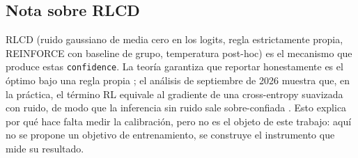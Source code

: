 \subsection{Nota sobre RLCD}

RLCD (ruido gaussiano de media cero en los logits, regla estrictamente propia, REINFORCE con baseline de
grupo, temperatura post-hoc) es el mecanismo que produce estas \texttt{confidence}. La teoría garantiza que
reportar honestamente es el óptimo bajo una regla propia \cite{gneiting2007}; el análisis de septiembre de
2026 muestra que, en la práctica, el término RL equivale al gradiente de una cross-entropy suavizada con
ruido, de modo que la inferencia sin ruido sale sobre-confiada
\cite{arXiv2609.38850,lakoreai2026}. Esto explica por qué hace falta medir la calibración, pero no
es el objeto de este trabajo: aquí no se propone un objetivo de entrenamiento, se construye el instrumento
que mide su resultado.
